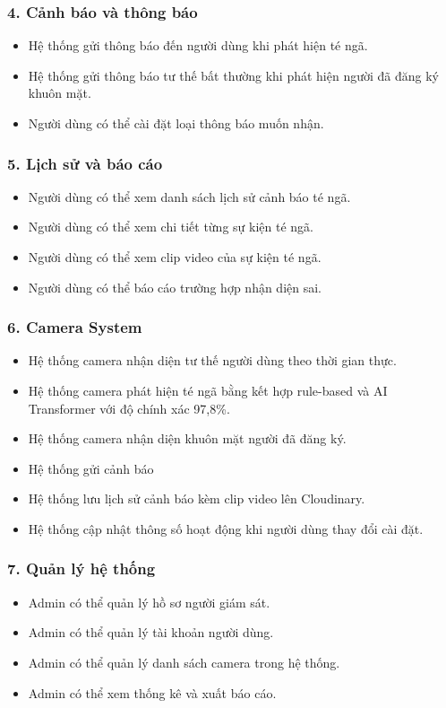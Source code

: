 \subsubsection*{4. Cảnh báo và thông báo}
\begin{itemize}[leftmargin=1.5cm]
  \item Hệ thống gửi thông báo đến người dùng khi phát hiện
        té ngã.
  \item Hệ thống gửi thông báo tư thế bất thường khi phát hiện
        người đã đăng ký khuôn mặt.
  \item Người dùng có thể cài đặt loại thông báo muốn nhận.
\end{itemize}

\subsubsection*{5. Lịch sử và báo cáo}
\begin{itemize}[leftmargin=1.5cm]
  \item Người dùng có thể xem danh sách lịch sử cảnh báo té ngã.
  \item Người dùng có thể xem chi tiết từng sự kiện té ngã.
  \item Người dùng có thể xem clip video của sự kiện té ngã.
  \item Người dùng có thể báo cáo trường hợp nhận diện sai.
\end{itemize}

\subsubsection*{6. Camera System}
\begin{itemize}[leftmargin=1.5cm]
  \item Hệ thống camera nhận diện tư thế người dùng theo thời
        gian thực.
  \item Hệ thống camera phát hiện té ngã bằng kết hợp rule-based
        và AI Transformer với độ chính xác 97,8\%.
  \item Hệ thống camera nhận diện khuôn mặt người đã đăng ký.
  \item Hệ thống gửi cảnh báo 
  \item Hệ thống lưu lịch sử cảnh báo kèm clip video lên
        Cloudinary.
  \item Hệ thống cập nhật thông số hoạt động khi người dùng
        thay đổi cài đặt.
\end{itemize}

\subsubsection*{7. Quản lý hệ thống}
\begin{itemize}[leftmargin=1.5cm]
  \item Admin có thể quản lý hồ sơ người giám sát.
  \item Admin có thể quản lý tài khoản người dùng.
  \item Admin có thể quản lý danh sách camera trong hệ thống.
  \item Admin có thể xem thống kê và xuất báo cáo.
\end{itemize}

